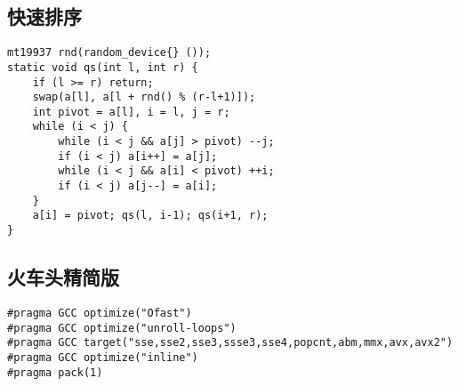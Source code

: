\documentclass[a4paper,landscape,twocolumn]{ctexart}
\begin{document}

\subsection{快速排序}

\begin{lstlisting}
mt19937 rnd(random_device{} ());
static void qs(int l, int r) {
	if (l >= r) return;
	swap(a[l], a[l + rnd() % (r-l+1)]);
	int pivot = a[l], i = l, j = r;
	while (i < j) {
		while (i < j && a[j] > pivot) --j;
		if (i < j) a[i++] = a[j];
		while (i < j && a[i] < pivot) ++i;
		if (i < j) a[j--] = a[i];
	}
	a[i] = pivot; qs(l, i-1); qs(i+1, r);
}
\end{lstlisting}

\subsection{火车头精简版}

\begin{lstlisting}
#pragma GCC optimize("Ofast")
#pragma GCC optimize("unroll-loops")
#pragma GCC target("sse,sse2,sse3,ssse3,sse4,popcnt,abm,mmx,avx,avx2")
#pragma GCC optimize("inline")
#pragma pack(1)
\end{lstlisting}
\end{document}
